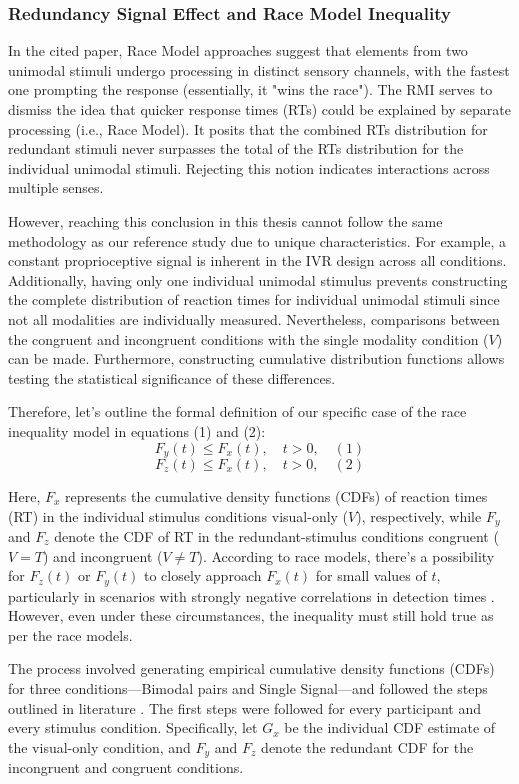 \documentclass[12pt,oneside,openright]{report}
\begin{document}
\subsubsection*{Redundancy Signal Effect and Race Model Inequality}

In the cited paper, Race Model approaches suggest that elements from two unimodal stimuli undergo processing in distinct sensory channels, with the fastest one prompting the response (essentially, it "wins the race"). The RMI serves to dismiss the idea that quicker response times (RTs) could be explained by separate processing (i.e., Race Model). It posits that the combined RTs distribution for redundant stimuli never surpasses the total of the RTs distribution for the individual unimodal stimuli. Rejecting this notion indicates interactions across multiple senses.

However, reaching this conclusion in this thesis cannot follow the same methodology as our reference study due to unique characteristics. For example, a constant proprioceptive signal is inherent in the IVR design across all conditions. Additionally, having only one individual unimodal stimulus prevents constructing the complete distribution of reaction times for individual unimodal stimuli since not all modalities are individually measured. Nevertheless, comparisons between the congruent and incongruent conditions with the single modality condition ($V$) can be made. Furthermore, constructing cumulative distribution functions allows testing the statistical significance of these differences.

Therefore, let's outline the formal definition of our specific case of the race inequality model in equations (1) and (2):
\[
F_y(t) \leq F_x(t), \quad t > 0, \quad (1)
\]
\[
F_z(t) \leq F_x(t), \quad t > 0, \quad (2)
\]

Here, $F_x$ represents the cumulative density functions (CDFs) of reaction times (RT) in the individual stimulus conditions visual-only ($V$), respectively, while $F_y$ and $F_z$ denote the CDF of RT in the redundant-stimulus conditions congruent ($V=T$) and incongruent ($V \neq T$). According to race models, there's a possibility for $F_z(t)$ or $F_y(t)$ to closely approach $F_x(t)$ for small values of $t$, particularly in scenarios with strongly negative correlations in detection times \parencite*{Ulrich2007}. However, even under these circumstances, the inequality must still hold true as per the race models.

The process involved generating empirical cumulative density functions (CDFs) for three conditions—Bimodal pairs and Single Signal—and followed the steps outlined in literature \parencite*{Ulrich2007}. The first steps were followed for every participant and every stimulus condition. Specifically, let $G_x$ be the individual CDF estimate of the visual-only condition, and $F_y$ and $F_z$ denote the redundant CDF for the incongruent and congruent conditions.
\end{document}
